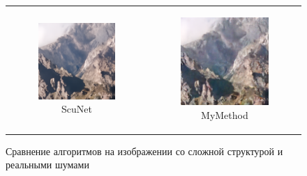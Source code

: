 \begin{figure}
\begin{tabular}{cc}
    \begin{subfigure}{0.3\textwidth}
      \includegraphics[width=\linewidth]{inc/research/complex/denoised_scunet.png}
      \caption{ScuNet}
    \end{subfigure} &
    \begin{subfigure}{0.3\textwidth}
      \includegraphics[width=\linewidth]{inc/research/complex/denoised_mycnn.png}
      \caption{MyMethod}
    \end{subfigure} \\
  \end{tabular}
  \caption{Сравнение алгоритмов на изображении со сложной структурой и реальными шумами}
  \label{fig:complex}
\end{figure}

